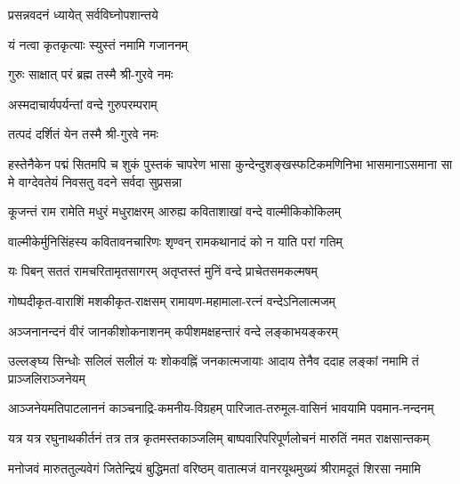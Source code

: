 
{प्रसन्नवदनं ध्यायेत् सर्वविघ्नोपशान्तये}

{यं नत्वा कृतकृत्याः स्युस्तं नमामि गजाननम्}


{गुरुः साक्षात् परं ब्रह्म तस्मै श्री-गुरवे नमः}

{अस्मदाचार्यपर्यन्तां वन्दे गुरुपरम्पराम्}

{तत्पदं दर्शितं येन तस्मै श्री-गुरवे नमः}

{हस्तेनैकेन पद्मं सितमपि च शुकं पुस्तकं चापरेण}
{भासा कुन्देन्दुशङ्खस्फटिकमणिनिभा भासमानाऽसमाना}
{सा मे वाग्देवतेयं निवसतु वदने सर्वदा सुप्रसन्ना}


\twolineshloka
{कूजन्तं राम रामेति मधुरं मधुराक्षरम्}
{आरुह्य कविताशाखां वन्दे वाल्मीकिकोकिलम्}

\twolineshloka
{वाल्मीकेर्मुनिसिंहस्य कवितावनचारिणः}
{शृण्वन् रामकथानादं को न याति परां गतिम्}

\twolineshloka
{यः पिबन् सततं रामचरितामृतसागरम्}
{अतृप्तस्तं मुनिं वन्दे प्राचेतसमकल्मषम्}

\resetShloka
{}

\twolineshloka
{गोष्पदीकृत-वाराशिं मशकीकृत-राक्षसम्}
{रामायण-महामाला-रत्नं वन्देऽनिलात्मजम्}

\twolineshloka
{अञ्जनानन्दनं वीरं जानकीशोकनाशनम्}
{कपीशमक्षहन्तारं वन्दे लङ्काभयङ्करम्}

\twolineshloka
{उल्लङ्घ्य सिन्धोः सलिलं सलीलं यः शोकवह्निं जनकात्मजायाः}
{आदाय तेनैव ददाह लङ्कां नमामि तं प्राञ्जलिराञ्जनेयम्}

\twolineshloka
{आञ्जनेयमतिपाटलाननं काञ्चनाद्रि-कमनीय-विग्रहम्}
{पारिजात-तरुमूल-वासिनं भावयामि पवमान-नन्दनम्}

\twolineshloka
{यत्र यत्र रघुनाथकीर्तनं तत्र तत्र कृतमस्तकाञ्जलिम्}
{बाष्पवारिपरिपूर्णलोचनं मारुतिं नमत राक्षसान्तकम्}

\twolineshloka
{मनोजवं मारुततुल्यवेगं जितेन्द्रियं बुद्धिमतां वरिष्ठम्}
{वातात्मजं वानरयूथमुख्यं श्रीरामदूतं शिरसा नमामि}

\resetShloka

